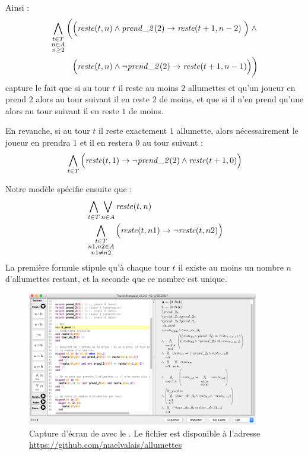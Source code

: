 Ainsi :
\begin{align}
\bigwedge_{\substack{t \in \turnsSet\\
n \in \matchesSet\\
n \geq 2}}
    \bigg ( & \Big ( \rest{t}{n} \land \takes{t} \limp%
    \rest{t+1}{n-2} \ \Big ) \; \land \\
    & \Big ( \rest{t}{n} \land \neg \takes{t} \limp %
    \rest{t+1}{n-1} \Big ) \bigg )
\end{align}
capture le fait que si au tour $t$ il reste au moins $2$ allumettes et qu'un joueur en prend $2$ alors au tour suivant il en reste $2$ de moins, et que si il n'en prend qu'une alors au tour suivant il en reste $1$ de moins.

En revanche, si au tour $t$ il reste exactement $1$ allumette, alors nécessairement le joueur en prendra $1$ et il en restera $0$ au tour suivant :
\begin{gather}
\bigwedge_{t \in T}
    \Big (\mathit{reste}(t, 1) \rightarrow \neg \mathit{prend\_2}(2) \land \mathit{reste}(t+1, 0)\Big )
\end{gather}

Notre modèle spécifie ensuite que :
\begin{align}
& \bigwedge_{t \in T}
    \bigvee_{n \in A}
        \mathit{reste}(t, n) \\
& \bigwedge_{\substack{t \in T\\ n1, n2 \in A\\ n1 \neq n2}}
    \Big ( \mathit{reste}(t, n1) \rightarrow \neg\mathit{reste}(t, n2) \Big )
\end{align}
La première formule stipule qu'à chaque tour $t$ il existe au moins un nombre $n$ d'allumettes restant, et la seconde que ce nombre est unique.

\begin{figure}
\centering
\includegraphics[width=0.9\textwidth]{figures/touistScreenshot}
\caption{Capture d'écran de \touist avec le \game. Le fichier est disponible à l'adresse \url{https://github.com/maelvalais/allumettes}}
\label{fig:touistScreenshot}
\end{figure}

